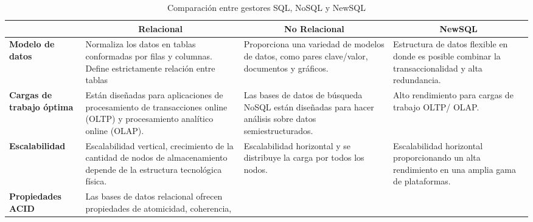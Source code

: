 \begin{footnotesize}
\begin{spacing}{1}
    \begin{center}

        \renewcommand*{\arraystretch}{1.4}
        \begin{longtable}[c]{ |>{\bfseries}p{}| p{}| p{}|  p{}|  }
            \caption[Comparación entre gestores SQL, NoSQL y NewSQL]{ Comparación entre gestores SQL, NoSQL y NewSQL\cite{lasluisa_evaluacion_2020} }\label{tab:table_sql_nosql_newsql} \\
            \hline
            \multicolumn{1}{|c|}{ \textbf{Descripción}} & \multicolumn{1}{c|}{\textbf{Relacional}} & \multicolumn{1}{c|}{ \textbf{No Relacional}} & \multicolumn{1}{c|}{ \textbf{NewSQL}} \\
            \hline
            Modelo de datos & Normaliza los datos en
            tablas conformadas por filas y columnas.
            Define estrictamente relación entre tablas
            & Proporciona una variedad
            de modelos de datos,
            como pares clave/valor,
            documentos y gráficos.
            & Estructura de datos
            flexible en donde es
            posible combinar la
            transaccionalidad y alta
            redundancia. \\
            \hline
            Cargas de trabajo óptima & Están diseñadas para
            aplicaciones de procesamiento
            de transacciones online (OLTP)
            y procesamiento analítico
            online (OLAP). & Las bases de datos de
            búsqueda NoSQL están
            diseñadas para hacer
            análisis sobre datos
            semiestructurados.
            & Alto rendimiento para
            cargas de trabajo OLTP/
            OLAP. \\
            \hline
            Escalabilidad & Escalabilidad vertical,
            crecimiento de la cantidad
            de nodos de almacenamiento
            depende de la estructura
            tecnológica física.
            & Escalabilidad horizontal y
            se distribuye la carga por
            todos los nodos.
            & Escalabilidad horizontal
            proporcionando un alta
            rendimiento en una amplia
            gama de plataformas. \\
            \hline
            Propiedades ACID & Las bases de datos relacional
            ofrecen propiedades de
            atomicidad, coherencia,

\end{longtable}
\end{center}
\end{spacing}
\end{footnotesize}
